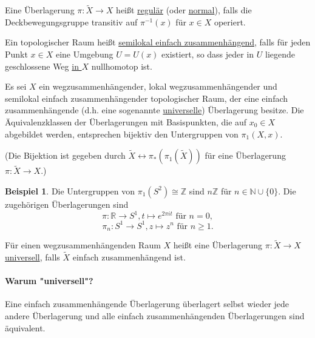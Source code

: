 \documentclass[a4paper,11pt,notitlepage]{report}
\theoremstyle{definition}
\newtheorem{example}{Beispiel}[chapter]
\newcommand{\R}{{\ensuremath{\mathbb{R}}}}
\newcommand{\N}{{\ensuremath{\mathbb{N}}}}
\newcommand{\Z}{{\ensuremath{\mathbb{Z}}}}
\begin{document}
\begin{definition}
	Eine Überlagerung $\pi \colon \widetilde{X} \rightarrow X$ heißt \underline{regulär} (oder \underline{normal}), falls die Deckbewegungsgruppe transitiv auf $\pi^{-1}(x)$ für $x \in X$ operiert.
\end{definition}

\begin{definition}
	Ein topologischer Raum heißt \underline{semilokal einfach zusammenhängend}, falls für jeden Punkt $x \in X$ eine Umgebung $U=U(x)$ existiert, so dass jeder in $U$ liegende geschlossene Weg \underline{in $X$} nullhomotop ist.
\end{definition}

\begin{theorem}
	Es sei $X$ ein wegzusammenhängender, lokal wegzusammenhängender und semilokal einfach zusammenhängender topologischer Raum, der eine einfach zusammenhängende (d.h. eine sogenannte \underline{universelle}) Überlagerung besitze.
	\newline
	Die Äquivalenzklassen der Überlagerungen mit Basispunkten, die auf $x_0 \in X$ abgebildet werden, entsprechen bijektiv den Untergruppen von $\pi_1(X,x)$.
\end{theorem}

(Die Bijektion ist gegeben durch $\widetilde{X} \leftrightarrow \pi_*(\pi_1(\widetilde{X}))$ für eine Überlagerung $\pi \colon \widetilde{X} \rightarrow X$.)

\begin{example}
	Die Untergruppen von $\pi_1(S^2) \cong \Z$ sind $n \Z$ für $n \in \N \cup \{0\}$.
	\newline
	Die zugehörigen Überlagerungen sind 
	$$\pi \colon \R \rightarrow S^1, t \mapsto e^{2 \pi i t} \text{ für } n = 0,$$
	$$\pi_n \colon S^1 \rightarrow S^1, z \mapsto z^n \text{ für } n \geq 1.$$
\end{example}

\begin{definition}
	Für einen wegzusammenhängenden Raum $X$ heißt eine Überlagerung $\pi \colon \widetilde{X} \rightarrow X$ \underline{universell}, falls $\widetilde{X}$ einfach zusammenhängend ist.
\end{definition}

\paragraph{Warum "universell"?}
Eine einfach zusammenhängende Überlagerung überlagert selbst wieder jede andere Überlagerung und alle einfach zusammenhängenden Überlagerungen sind äquivalent.
\end{document}

